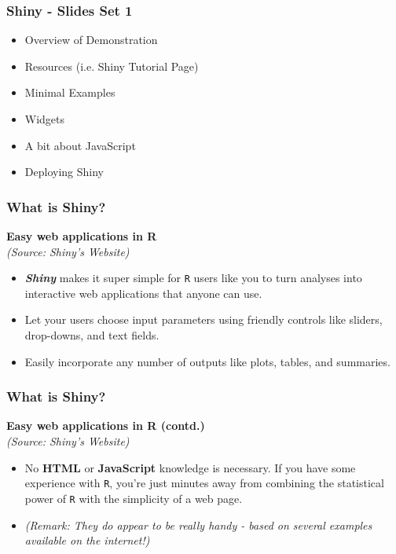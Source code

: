 \documentclass{beamer}
\begin{document}
\begin{frame}
\frametitle{Shiny - Slides Set 1}
\Large
\begin{itemize}
\item Overview of Demonstration
\item Resources (i.e. Shiny Tutorial Page)
\item Minimal Examples 
\item Widgets
\item A bit about JavaScript
\item Deploying Shiny
\end{itemize}
\end{frame}

\begin{frame}
\Large
\frametitle{What is Shiny?}
\textbf{Easy web applications in R}\\
\textit{(Source: Shiny's Website)}
\begin{itemize}
\item \textbf{\textit{Shiny}} makes it super simple for \texttt{R} users like you to turn analyses into interactive web applications that anyone can use. \item Let your users choose input parameters using friendly controls like sliders, drop-downs, and text fields. \item Easily incorporate any number of outputs like plots, tables, and summaries.
\end{itemize}
\end{frame}
\begin{frame}
\Large
\frametitle{What is Shiny?}
\vspace{-1cm}
\textbf{Easy web applications in R (contd.)}\\
\textit{(Source: Shiny's Website)}
\begin{itemize}
\item No \textbf{HTML} or \textbf{JavaScript} knowledge is necessary. If you have some experience with \texttt{R}, you’re just minutes away from combining the statistical power of \texttt{R} with the simplicity of a web page.
\item \textit{(Remark: They do appear to be really handy - based on several examples  available on the internet!)}
\end{itemize}

\end{frame}
\end{document}
